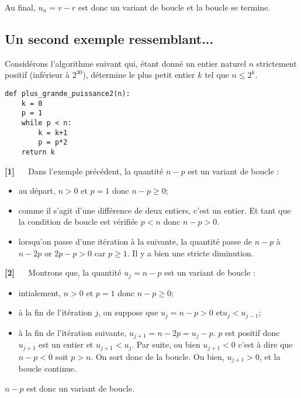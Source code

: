 Au final, $u_n = v-r$ est donc un variant de boucle et la boucle se termine.


\subsection{Un second exemple ressemblant...} 




Considérons l’algorithme suivant qui, étant donné un entier naturel $n$ strictement positif (inférieur à $2^{30}$), détermine le plus petit entier $k$ tel que $n \leq 2^k$.
\begin{lstlisting}
def plus_grande_puissance2(n):
    k = 0
    p = 1
    while p < n:
        k = k+1
        p = p*2
    return k
\end{lstlisting}
\textbf{[1]} $\quad$
Dans l’exemple précédent, la quantité $n - p$ est un variant de boucle :
\begin{itemize}
\item au départ, $n > 0$ et $p = 1$ donc $n - p \geq 0$;
\item comme il s’agit d’une différence de deux entiers, c’est un entier. Et tant que la condition
de boucle est vérifiée $p < n$ donc $n - p > 0$.
\item lorsqu’on passe d’une itération à la suivante, la quantité passe de $n-p$ à $n-2p$ or $2p-p > 0$
car $p \geq 1$. Il y a bien une stricte diminution.
\end{itemize}

\textbf{[2]} $\quad$
Montrons que, la quantité $u_j = n - p$ est un variant de boucle :
\begin{itemize}
\item intialement, $n > 0$ et $p = 1$ donc $n - p \geq 0$;
\item à la fin de l'itération $j$, on suppose que $u_j = n - p >0 $ et$u_j < u_{j-1}$;
\item à la fin de l'itération suivante, $u_{j+1}=n-2p = u_j - p$. $p$ est positif donc $u_{j+1}$ est un entier et $u_{j+1}<u_j$. Par suite, ou bien $u_{j+1}<0$ c'est à dire que $n-p<0$ soit $p>n$. On sort donc de la boucle. Ou bien, $u_{j+1}>0$, et la boucle continue.
\end{itemize}
$n - p$ est donc un variant de boucle.

